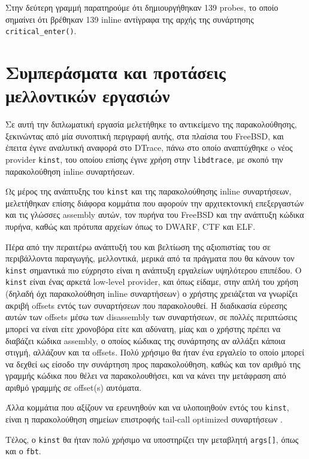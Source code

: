 \documentclass[12pt]{article}
\begin{document}
Στην δεύτερη γραμμή παρατηρούμε ότι δημιουργήθηκαν 139 probes, το οποίο
σημαίνει ότι βρέθηκαν 139 inline αντίγραφα της αρχής της συνάρτησης
\lstinline{critical_enter()}.

\pagebreak
\section{Συμπεράσματα και προτάσεις μελλοντικών εργασιών}

Σε αυτή την διπλωματική εργασία μελετήθηκε το αντικείμενο της παρακολούθησης,
ξεκινώντας από μία συνοπτική περιγραφή αυτής, στα πλαίσια του FreeBSD, και
έπειτα έγινε αναλυτική αναφορά στο DTrace, πάνω στο οποίο αναπτύχθηκε o νέος
provider \lstinline{kinst}, του οποίου επίσης έγινε χρήση στην
\lstinline{libdtrace}, με σκοπό την παρακολούθηση inline συναρτήσεων.

Ως μέρος της ανάπτυξης του \lstinline{kinst} και της παρακολούθησης inline
συναρτήσεων, μελετήθηκαν επίσης διάφορα κομμάτια που αφορούν την αρχιτεκτονική
επεξεργαστών και τις γλώσσες assembly αυτών, τον πυρήνα του FreeBSD και την
ανάπτυξη κώδικα πυρήνα, καθώς και πρότυπα αρχείων όπως το DWARF, CTF και ELF.

Πέρα από την περαιτέρω ανάπτυξή του και βελτίωση της αξιοπιστίας του σε
περιβάλλοντα παραγωγής, μελλοντικά, μερικά από τα πράγματα που θα κάνουν τον
\lstinline{kinst} σημαντικά πιο εύχρηστο είναι η ανάπτυξη εργαλείων υψηλότερου
επιπέδου. Ο \lstinline{kinst} είναι ένας αρκετά low-level provider, και όπως
είδαμε, στην απλή του χρήση (δηλαδή όχι παρακολούθηση inline συναρτήσεων) ο
χρήστης χρειάζεται να γνωρίζει ακριβή offsets εντός των συναρτήσεων που
παρακολουθεί. Η διαδικασία εύρεσης αυτών των offsets μέσω των disassembly των
συναρτήσεων, σε πολλές περιπτώσεις μπορεί να είναι είτε χρονοβόρα είτε και
αδύνατη, μίας και ο χρήστης πρέπει να διαβάζει κώδικα assembly, ο οποίος
κώδικας της συνάρτησης αν αλλάξει κάποια στιγμή, αλλάζουν και τα offsets. Πολύ
χρήσιμο θα ήταν ένα εργαλείο το οποίο μπορεί να δεχθεί ως είσοδο την συνάρτηση
προς παρακολούθηση, καθώς και τον αριθμό της γραμμής κώδικα που θέλει να
παρακολουθήσει, και να κάνει την μετάφραση από αριθμό γραμμής σε offset(s)
αυτόματα.

Άλλα κομμάτια που αξίζουν να ερευνηθούν και να υλοποιηθούν εντός του
\lstinline{kinst}, είναι η παρακολούθηση σημείων επιστροφής tail-call optimized
συναρτήσεων \cite{tailcall}.

Τέλος, ο \lstinline{kinst} θα ήταν πολύ χρήσιμο να υποστηρίζει την μεταβλητή
\lstinline{args[]}, όπως και ο \lstinline{fbt}.
\end{document}
